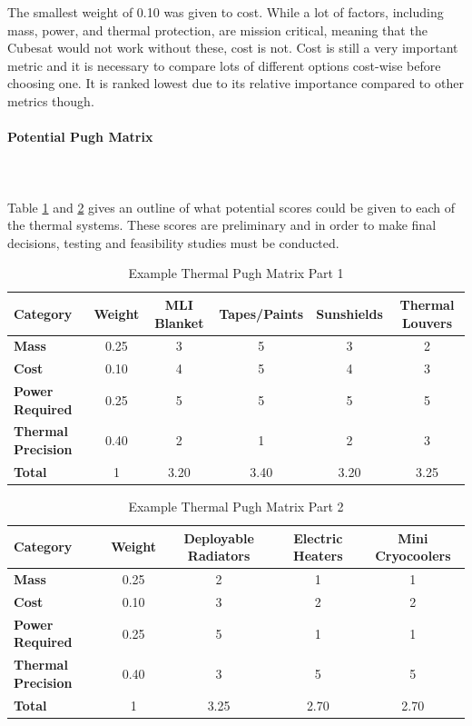 The smallest weight of 0.10 was given to cost.  While a lot of factors, including mass, power, and thermal protection, are mission critical, meaning that the Cubesat would not work without these, cost is not.  Cost is still a very important metric and it is necessary to compare lots of different options cost-wise before choosing one.  It is ranked lowest due to its relative importance compared to other metrics though.\\

\paragraph{Potential Pugh Matrix} ~\\~\\
Table \ref{tbl:thermal_pugh1} and \ref{tbl:thermal_pugh2} gives an outline of what potential scores could be given to each of the thermal systems. These scores are preliminary and in order to make final decisions, testing and feasibility studies must be conducted. 
\begin{table}[H]
\centering
\begin{tabular}{|l|c|c|c|c|c|} 
\hline
    \textbf{Category} & \textbf{Weight} & \textbf{MLI Blanket} & \textbf{Tapes/Paints} & \textbf{Sunshields} & \textbf{Thermal Louvers}
    \\
\hline
    \textbf{Mass} & 0.25 & 3 & 5 & 3 & 2 
    \\
\hline
    \textbf{Cost} & 0.10 & 4 & 5 & 4 & 3 
    \\
\hline
    \textbf{Power Required} & 0.25 & 5 & 5 & 5 & 5
    \\
\hline
    \textbf{Thermal Precision} & 0.40 & 2 & 1 & 2 & 3
    \\
\hline
    \textbf{Total} & 1 & 3.20 & 3.40 & 3.20 & 3.25
    \\
\hline
\end{tabular}
\caption{Example Thermal Pugh Matrix Part 1 }
\label{tbl:thermal_pugh1}
\end{table}

\begin{table}[H]
\centering
\begin{tabular}{|l|c|c|c|c|} 
\hline
    \textbf{Category} & \textbf{Weight} & \textbf{Deployable Radiators} & \textbf{Electric Heaters} & \textbf{Mini Cryocoolers}
    \\
\hline
    \textbf{Mass} & 0.25 & 2 & 1 & 1
    \\
\hline
    \textbf{Cost} & 0.10 &  3 & 2 & 2
    \\
\hline
    \textbf{Power Required} & 0.25 & 5 & 1 & 1
    \\
\hline
    \textbf{Thermal Precision} & 0.40 & 3 & 5 & 5
    \\
\hline
    \textbf{Total} & 1 & 3.25 & 2.70 & 2.70
    \\
\hline
\end{tabular}
\caption{Example Thermal Pugh Matrix Part 2 }
\label{tbl:thermal_pugh2}
\end{table}

